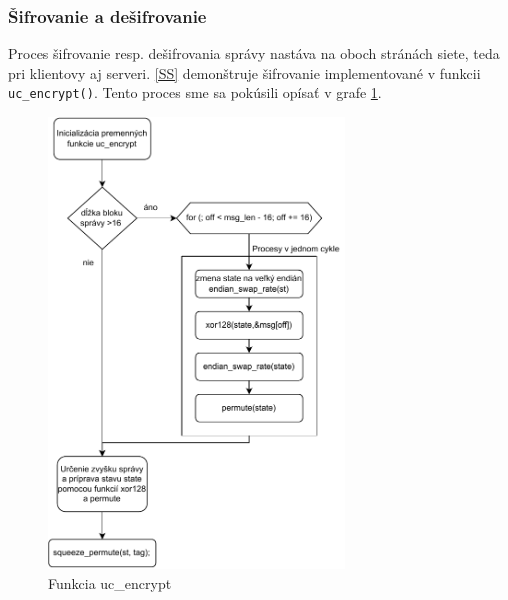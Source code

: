 \subsubsection{Šifrovanie a dešifrovanie}
Proces šifrovanie resp. dešifrovania správy nastáva na oboch stránách siete, teda pri klientovy aj serveri. \ref{SS} demonštruje šifrovanie implementované v funkcii \lstinline|uc_encrypt()|. Tento proces sme sa pokúsili opísať v grafe \ref{fc3}. 

\begin{figure}
	\centering
	\includegraphics[width=0.7\textwidth]{figures/fc3}
	\caption{Funkcia uc\_encrypt}
	\label{fc3}
\end{figure}


